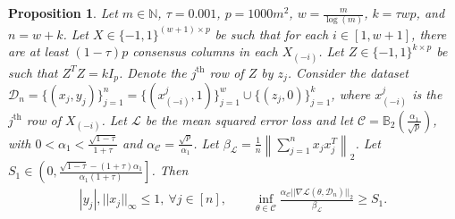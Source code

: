 \documentclass{article}
\newtheorem{prop}{Proposition}
\begin{document}
\begin{prop}
\label{prop:MatchData}
Let $m \in \mathbb{N}$, $\tau = 0.001$, $p = 1000m^2$, $w = \frac{m}{\log(m)}$, $k = \tau w p$, and $n = w + k$. Let $X \in \{-1, 1\}^{(w + 1) \times p}$ be such that for each $i \in [1, w + 1]$, there are at least $(1 - \tau)p$ consensus columns in each $X_{(-i)}$. Let $Z \in \{-1, 1\}^{k \times p}$ be such that $Z^TZ = kI_p$. Denote the $j^{\text{th}}$ row of $Z$ by $z_j$.
Consider the dataset $\mathcal{D}_n = \{(x_j, y_j)\}_{j = 1}^n = \{(x^j_{(-i)}, 1)\}_{j = 1}^w \cup \{(z_j, 0)\}_{j = 1}^k$, where $x^j_{(-i)}$ is the $j^{\text{th}}$ row of $X_{(-i)}$. Let $\mathcal{L}$ be the mean squared error loss and let $\mathcal{C} = \mathbb{B}_2\left(\frac{\alpha_1}{\sqrt{p}}\right)$, with $0 < \alpha_1 < \frac{\sqrt{1 - \tau}}{1 + \tau}$ and $\alpha_{\mathcal{C}} = \frac{\sqrt{p}}{\alpha_1}$. Let $\beta_{\mathcal{L}} = \frac{1}{n}\left\|\sum_{j = 1}^nx_jx_j^T\right\|_2$. Let $S_1 \in \left(0, \frac{\sqrt{1 - \tau} - (1 + \tau)\alpha_1}{\alpha_1(1 + \tau)}\right]$. Then
\begin{align}
\label{eq:MatchEq}
|y_j|, ||x_j||_{\infty} \leq 1, \ \forall j \in [n], \qquad \mathop{\inf}\limits_{\theta \in \mathcal{C}}\frac{\alpha_{\mathcal{C}}||\nabla \mathcal{L}(\theta, \mathcal{D}_n)||_2}{\beta_{\mathcal{L}}} \geq S_1.
\end{align}
\end{prop}
\end{document}
